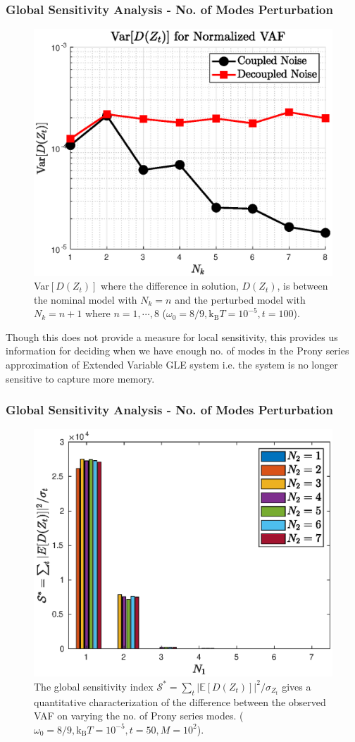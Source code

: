 \documentclass[a4paper,10pt]{beamer}
\newcommand{\E}[1]{\mathbb{E}\left[ #1 \right]}
\newcommand{\sqb}[1]{\left[ #1 \right]}
\newcommand{\rb}[1]{\left( #1 \right)}
\begin{document}
	\begin{frame}
		\frametitle{\large Global Sensitivity Analysis - No. of Modes Perturbation}
		\begin{figure}[H]
			\includegraphics[width=0.5\linewidth]{./Plots/sensitivityAnalysis/NkSensitivity.eps}
			\caption{\footnotesize Var$\sqb{D\rb{Z_{t}}}$ where the difference in solution, $D\rb{Z_{t}}$, is between the nominal model with $N_{k} = n$ and the perturbed model with $N_{k} = n+1$ where $n = 1, \cdots, 8$ ($\omega_{0} = 8/9,\text{k}_{\text{B}}T = 10^{-5},t=100$).}
		\end{figure}
		Though this does not provide a measure for local sensitivity, this provides us information for deciding when we have enough no. of modes in the Prony series approximation of Extended Variable GLE system i.e. the system is no longer sensitive to capture more memory.
	\end{frame}

	\begin{frame}
		\frametitle{\large Global Sensitivity Analysis - No. of Modes Perturbation}
		\begin{figure}[H]
			\centering
			\includegraphics[width=0.75\linewidth]{./Plots/sensitivityAnalysis/SStarCoupled.eps}
			\caption{The global sensitivity index $\mathcal{S}^{*} = \sum_{t} \left| \E{D\rb{Z_{t}}} \right| ^{2} / \sigma_{Z_{t}}$ gives a quantitative characterization of the difference between the observed VAF on varying the no. of Prony series modes. ($\omega_{0} = 8/9,\text{k}_{\text{B}}T = 10^{-5},t=50,M=10^{2}$).}
		\end{figure}
	\end{frame}
\end{document}
